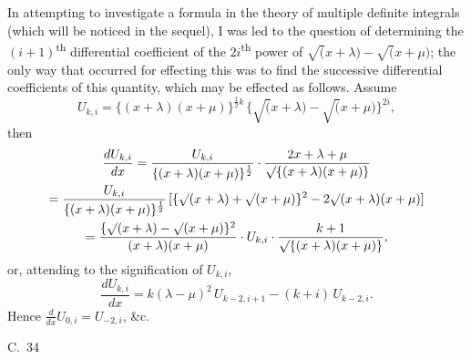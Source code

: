 \documentclass[11pt,a4paper]{article}
\begin{document}
In attempting to investigate a formula in the theory of multiple definite integrals (which will be noticed in the sequel), I was led to the question of determining the $(i+1)$\textsuperscript{th} differential coefficient of the $2i$\textsuperscript{th} power of $\surd(x+\lambda) - \surd(x+\mu)$; the only way that occurred for effecting this was to find the successive differential coefficients of this quantity, which may be effected as follows. Assume
\[
U_{k,i} = \{(x+\lambda)(x+\mu)\}^{\frac{1}{2}k} \, \{\surd(x+\lambda) - \surd(x+\mu)\}^{2i},
\]
then
\begin{multline*}
\frac{dU_{k,i}}{dx} = \frac{U_{k,i}}{\{(x+\lambda)(x+\mu)\}^{\frac{1}{2}}} \cdot \frac{2x+\lambda+\mu}{\surd\{(x+\lambda)(x+\mu)\}} \\
= \frac{U_{k,i}}{\{(x+\lambda)(x+\mu)\}^{\frac{1}{2}}} \, [\{\surd(x+\lambda) + \surd(x+\mu)\}^2 - 2\surd(x+\lambda)(x+\mu)] \\
= \frac{\{\surd(x+\lambda) - \surd(x+\mu)\}^2}{(x+\lambda)(x+\mu)} \cdot U_{k,i} \cdot \frac{k+1}{\surd\{(x+\lambda)(x+\mu)\}},
\end{multline*}
or, attending to the signification of $U_{k,i}$,
\[
\frac{dU_{k,i}}{dx} = k(\lambda-\mu)^2 \, U_{k-2,i+1} - (k+i) \, U_{k-2,i}.
\]
Hence $\frac{d}{dx} U_{0,i} = U_{-2,i}$, \&c.

\vspace{10pt}
\begin{center}
C.~34
\end{center}
\end{document}
